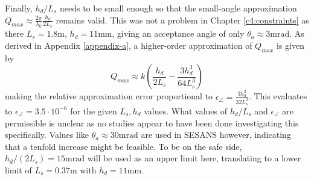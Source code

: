 \documentclass{article}
\begin{document}
Finally, $h_d/L_s$ needs to be small enough so that the small-angle approximation $Q_{max} \approx \frac{2\pi}{\lambda_0}\frac{h_d}{2L_s}$ remains valid. This was not a problem in Chapter \ref{c4:constraints} as there $L_s = 1.8\unit{\meter}$, $h_d = 11\unit{\milli\meter}$, giving an acceptance angle of only $\theta_a \approx 3\unit{\milli\radian}$. As derived in Appendix \ref{appendix-a}, a higher-order approximation of $Q_{max}$ is given by
$$Q_{max} \approx  k(\frac{h_d}{2L_s} - \frac{3h_d^3}{64L_s^3})$$
making the relative approximation error proportional to $\epsilon_\angle = \frac{3h_d^2}{32L_s^2}$. This evaluates to $\epsilon_\angle = 3.5 \cdot 10^{-6}$ for the given $L_s, h_d$ values. What values of $h_d/L_s$ and $\epsilon_\angle$ are permissible is unclear as no studies appear to have been done investigating this specifically. Values like $\theta_a \approx 30\unit{\milli\radian}$ are used in SESANS \cite{rekveldt1996} however, indicating that a tenfold increase might be feasible. To be on the safe side, $h_d / (2L_s) = 15\unit{\milli\radian}$ will be used as an upper limit here, translating to a lower limit of $L_s = 0.37\unit{\meter}$ with $h_d = 11\unit{\milli\meter}$.

\end{document}
